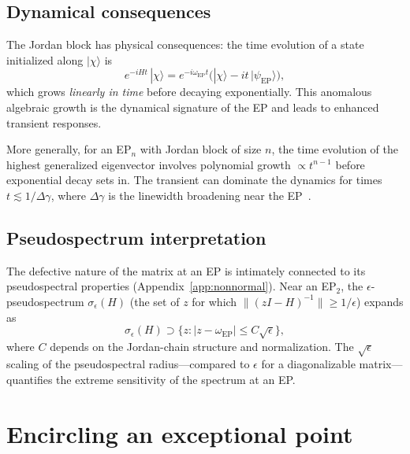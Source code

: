 \subsection{Dynamical consequences}
\label{ssec:jordan-dynamics}

The Jordan block has physical consequences: the time evolution of a
state initialized along $|\chi\rangle$ is
\begin{equation}
 e^{-iHt}\,|\chi\rangle
 = e^{-i\omega_{\mathrm{EP}}t}
 \bigl(|\chi\rangle - it\,|\psi_{\mathrm{EP}}\rangle\bigr),
 \label{eq:jordan-evolution}
\end{equation}
which grows \emph{linearly in time} before decaying exponentially. This
anomalous algebraic growth is the dynamical signature of the EP and
leads to enhanced transient responses.

More generally, for an EP$_n$ with Jordan block of size $n$, the time
evolution of the highest generalized eigenvector involves polynomial
growth $\propto t^{n-1}$ before exponential decay sets in. The
transient can dominate the dynamics for times $t \lesssim 1/\Delta\gamma$,
where $\Delta\gamma$ is the linewidth broadening near the EP~\cite{anderson2022clarification,smith2020beyond,smith2022beyond}.

\subsection{Pseudospectrum interpretation}
\label{ssec:jordan-pseudospectrum}

The defective nature of the matrix at an EP is intimately connected
to its pseudospectral properties
(Appendix~\ref{app:nonnormal}). Near an EP$_2$, the
$\epsilon$-pseudospectrum $\sigma_\epsilon(H)$ (the set of $z$ for which
$\|(zI-H)^{-1}\| \ge 1/\epsilon$) expands as
\begin{equation}
 \sigma_\epsilon(H) \supset
 \{z : |z - \omega_{\mathrm{EP}}| \le C\sqrt{\epsilon}\},
 \label{eq:pseudospectrum-ep}
\end{equation}
where $C$ depends on the Jordan-chain structure and normalization. The
$\sqrt{\epsilon}$ scaling of the pseudospectral radius---compared to
$\epsilon$ for a diagonalizable matrix---quantifies the extreme
sensitivity of the spectrum at an EP.


\section{Encircling an exceptional point}
\label{sec:encircling}

